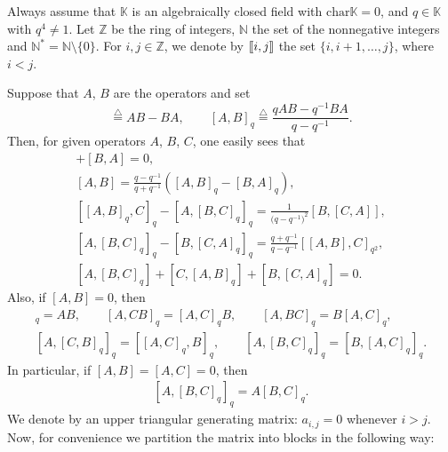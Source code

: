 \documentclass[10pt,a4paper]{amsart}
\numberwithin{equation}{section}
\def\lq#1{\left[#1\right]_q}
\def\K{\mathbb{K}}
\def\A{\mathscr{A}}
\def\lbb#1{\left[\kern-0.15em\left[ {#1} \right] \kern-0.15em\right]}
\begin{document}
Always assume that $\K$ is an algebraically closed field with $\mathrm{char} \K=0$,
and $q \in \K$ with $q^4 \neq 1$. Let $\mathbb{Z}$ be the ring of integers, $\mathbb{N}$ the set of the nonnegative integers and $\mathbb{N}^*=\mathbb{N} \setminus\{0\}.$
For $i, j \in \mathbb{Z}$, we denote by $\lbb{i,j}$ the set $\{i, i+1, \dots, j\}$, where $i<j$.

Suppose that $A$, $B$ are the operators and set
\begin{equation*}
[A, B] \overset{\bigtriangleup}{=} AB-BA, \qquad \lq{A,B}\overset{\bigtriangleup}{=} \frac{qAB-q^{-1}BA}{q-q^{-1}}.
\end{equation*}
Then, for given operators $A$, $B$, $C$, one easily sees that
\begin{gather} %
[A,B]+[B,A]=0, \label{eq:jacobi}\\
 [A,B]=\frac{q-q^{-1}}{q+q^{-1}}([A,B]_q-[B,A]_q), \label{eq:qjacobi0}\\
[[A,B]_q,C]_q-[A,[B,C]_q]_q =\frac{1}{\bigl(q-q^{-1}\bigr)^2} [B,[C,A]], \label{eq:qjacobi1}\\
[A,[B,C]_q]_q-[B,[C,A]_q]_q =\frac{q+q^{-1}}{q-q^{-1}} [[A,B],C]_{q^2},\\
[A,[B,C]_q]+[C,[A,B]_q]+ [B,[C,A]_{q}]=0. \label{eq:qjacobi3}
\end{gather}
Also, if $[A,B]=0$, then
\begin{gather}
 [A,B]_q=AB, \qquad [A,CB]_q=[A,C]_qB, \qquad [A,BC]_q=B[A,C]_q, \label{equ:comm1}\\
 [A, [C,B]_q]_q=[[A,C]_q,B]_q, \qquad [A,[B,C]_q]_q=[B,[A,C]_q]_q. \label{equ:comm2}
\end{gather}
In particular, if $[A,B]=[A,C]=0$, then
\begin{eqnarray}\label{equ:comm3}
[A, [B,C]_q]_q=A[B,C]_q.
\end{eqnarray}
We denote by \smash{$\A \overset{\bigtriangleup}{=} (a_{i,j})_{n\times n}$} an upper triangular generating matrix: $a_{i,j}=0$ whenever $i>j$.
Now, for convenience we partition the matrix into blocks in the following way:
\end{document}
